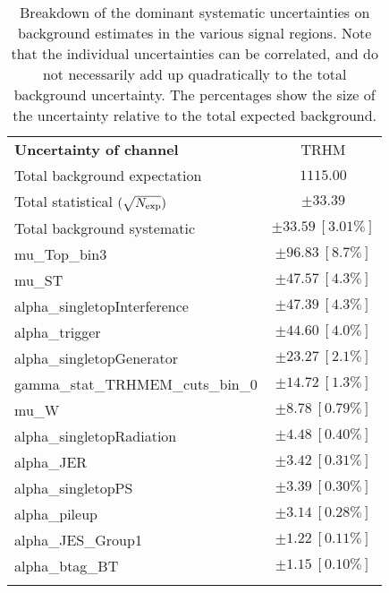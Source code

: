 
\begin{table}
\begin{center}
\setlength{\tabcolsep}{0.0pc}
\begin{tabular*}{\textwidth}{@{\extracolsep{\fill}}lc}
\noalign{\smallskip}\hline\noalign{\smallskip}
{\bf Uncertainty of channel}                                    & TRHM           \\
\noalign{\smallskip}\hline\noalign{\smallskip}
Total background expectation             &  $1115.00$       \\
\noalign{\smallskip}\hline\noalign{\smallskip}
Total statistical $(\sqrt{N_{\rm exp}})$              & $\pm 33.39$       \\
Total background systematic               & $\pm 33.59\ [3.01\%] $             \\
\noalign{\smallskip}\hline\noalign{\smallskip}
\noalign{\smallskip}\hline\noalign{\smallskip}
mu\_Top\_bin3         & $\pm 96.83\ [8.7\%] $       \\
mu\_ST         & $\pm 47.57\ [4.3\%] $       \\
alpha\_singletopInterference         & $\pm 47.39\ [4.3\%] $       \\
alpha\_trigger         & $\pm 44.60\ [4.0\%] $       \\
alpha\_singletopGenerator         & $\pm 23.27\ [2.1\%] $       \\
gamma\_stat\_TRHMEM\_cuts\_bin\_0         & $\pm 14.72\ [1.3\%] $       \\
mu\_W         & $\pm 8.78\ [0.79\%] $       \\
alpha\_singletopRadiation         & $\pm 4.48\ [0.40\%] $       \\
alpha\_JER         & $\pm 3.42\ [0.31\%] $       \\
alpha\_singletopPS         & $\pm 3.39\ [0.30\%] $       \\
alpha\_pileup         & $\pm 3.14\ [0.28\%] $       \\
alpha\_JES\_Group1         & $\pm 1.22\ [0.11\%] $       \\
alpha\_btag\_BT         & $\pm 1.15\ [0.10\%] $       \\
\noalign{\smallskip}\hline\noalign{\smallskip}
\end{tabular*}
\end{center}
\caption[Breakdown of uncertainty on background estimates]{
Breakdown of the dominant systematic uncertainties on background estimates in the various signal regions.
Note that the individual uncertainties can be correlated, and do not necessarily add up quadratically to 
the total background uncertainty. The percentages show the size of the uncertainty relative to the total expected background.
\label{table.results.bkgestimate.uncertainties.TRHMEM_cuts}}
\end{table}
%